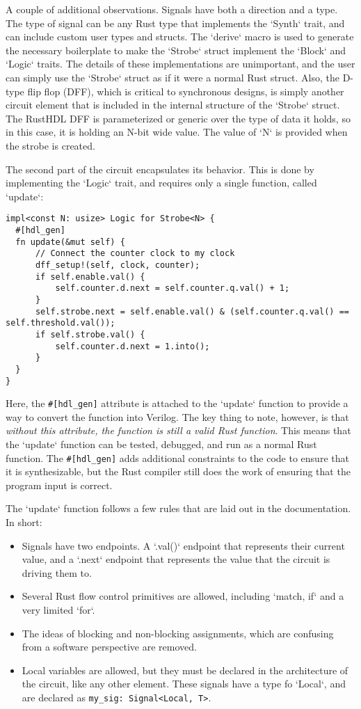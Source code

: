 \documentclass[conference]{IEEEtran}
\begin{document}
A couple of additional observations.  Signals have both a direction and a type.  The type of
signal can be any Rust type that implements the `Synth` trait, and can include custom user
types and structs.  The `derive` macro is used to generate the necessary boilerplate to make the 
`Strobe` struct implement the `Block` and `Logic` traits.  The details of these implementations are
unimportant, and the user can simply use the `Strobe` struct as if it were a normal Rust struct.  Also,
the D-type flip flop (DFF), which is critical to synchronous designs, is simply another circuit element that
is included in the internal structure of the `Strobe` struct.  The RustHDL DFF is parameterized or 
generic over the type of data it holds, so in this case, it is holding an N-bit wide value.  The value of
`N` is provided when the strobe is created.

The second part of the circuit encapsulates its behavior.  This is done by implementing the `Logic` trait,
and requires only a single function, called `update`:

\begin{verbatim}
impl<const N: usize> Logic for Strobe<N> {
  #[hdl_gen]
  fn update(&mut self) {
      // Connect the counter clock to my clock
      dff_setup!(self, clock, counter);
      if self.enable.val() {
          self.counter.d.next = self.counter.q.val() + 1;
      }
      self.strobe.next = self.enable.val() & (self.counter.q.val() == self.threshold.val());
      if self.strobe.val() {
          self.counter.d.next = 1.into();
      }
  }
}
\end{verbatim}

Here, the \verb|#[hdl_gen]| attribute is attached to the `update` function to provide a way to convert the function
into Verilog.  The key thing to note, however, is that \emph{without this attribute, the function is still a valid Rust function}.
This means that the `update` function can be tested, debugged, and run as a normal Rust function.  The \verb|#[hdl_gen]| adds
additional constraints to the code to ensure that it is synthesizable, but the Rust compiler still does the work of ensuring that the 
program input is correct.

The `update` function follows a few rules that are laid out in the documentation.  In short:
\begin{itemize}
  \item Signals have two endpoints.  A `.val()` endpoint that represents their current value, and a `.next` endpoint that represents
    the value that the circuit is driving them to.
  \item Several Rust flow control primitives are allowed, including `match, if` and a very limited `for`.  
  \item The ideas of blocking and non-blocking assignments, which are confusing from a software perspective are removed.  
  \item Local variables are allowed, but they must be declared in the architecture of the circuit, like any other element.
  These signals have a type fo `Local`, and are declared as \verb|my_sig: Signal<Local, T>|.
\end{itemize}
\end{document}
